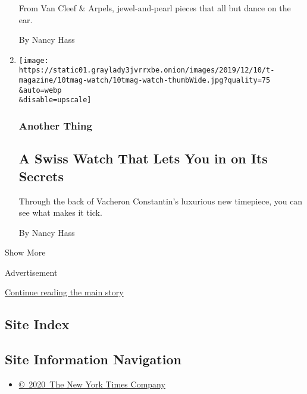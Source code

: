 \begin{enumerate}
  From Van Cleef \& Arpels, jewel-and-pearl pieces that all but dance on
  the ear.

  By Nancy Hass
\item
  \href{/2019/12/10/t-magazine/vacheron-constantin-watch.html}{}

  \texttt{[image: https://static01.graylady3jvrrxbe.onion/images/2019/12/10/t-magazine/10tmag-watch/10tmag-watch-thumbWide.jpg?quality=75\\\&auto=webp\\\&disable=upscale]}

  \hypertarget{another-thing-2}{%
  \subsubsection{Another Thing}\label{another-thing-2}}

  \hypertarget{a-swiss-watch-that-lets-you-in-on-its-secrets}{%
  \subsection{A Swiss Watch That Lets You in on Its
  Secrets}\label{a-swiss-watch-that-lets-you-in-on-its-secrets}}

  Through the back of Vacheron Constantin's luxurious new timepiece, you
  can see what makes it tick.

  By Nancy Hass
\end{enumerate}

Show More

Advertisement

\protect\hyperlink{after-mid2}{Continue reading the main story}

\hypertarget{site-index}{%
\subsection{Site Index}\label{site-index}}

\hypertarget{site-information-navigation}{%
\subsection{Site Information
Navigation}\label{site-information-navigation}}

\begin{itemize}
\tightlist
\item
  \href{https://help.nytimes3xbfgragh.onion/hc/en-us/articles/115014792127-Copyright-notice}{©~2020~The
  New York Times Company}
\end{itemize}

